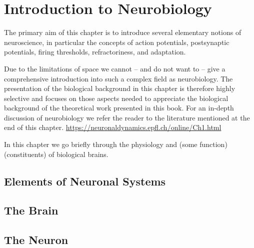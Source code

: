 \chapter{Introduction to Neurobiology}\label{chap:neurobio}

The primary aim of this chapter is to introduce several elementary notions of neuroscience, in particular the concepts of action potentials, postsynaptic potentials, firing thresholds, refractoriness, and adaptation.

Due to the limitations of space we cannot – and do not want to – give a comprehensive introduction into such a complex field as neurobiology. The presentation of the biological background in this chapter is therefore highly selective and focuses on those aspects needed to appreciate the biological background of the theoretical work presented in this book. For an in-depth discussion of neurobiology we refer the reader to the literature mentioned at the end of this chapter. \url{https://neuronaldynamics.epfl.ch/online/Ch1.html}

In this chapter we go briefly through the physiology and (some function)(constituents) of biological brains.

\section{Elements of Neuronal Systems}

\section{The Brain}



\section{The Neuron}




